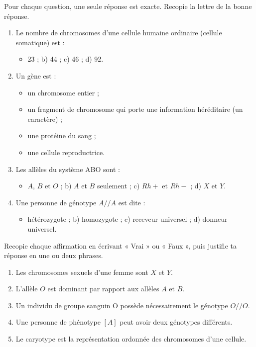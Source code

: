 \documentclass[11pt]{article}
\begin{document}
\begin{exercice}
Pour chaque question, une seule réponse est exacte. Recopie la lettre de la bonne réponse.
\begin{enumerate}
\item Le nombre de chromosomes d'une cellule humaine ordinaire (cellule somatique) est :
\begin{itemize}
\item[a)] 23 ; \quad b) 44 ; \quad c) 46 ; \quad d) 92.
\end{itemize}
\item Un gène est :
\begin{itemize}
\item[a)] un chromosome entier ;
\item[b)] un fragment de chromosome qui porte une information héréditaire (un caractère) ;
\item[c)] une protéine du sang ;
\item[d)] une cellule reproductrice.
\end{itemize}
\item Les allèles du système ABO sont :
\begin{itemize}
\item[a)] $A$, $B$ et $O$ ; \quad b) $A$ et $B$ seulement ; \quad c) $Rh+$ et $Rh-$ ; \quad d) $X$ et $Y$.
\end{itemize}
\item Une personne de génotype $A//A$ est dite :
\begin{itemize}
\item[a)] hétérozygote ; \quad b) homozygote ; \quad c) receveur universel ; \quad d) donneur universel.
\end{itemize}
\end{enumerate}
\end{exercice}

\begin{exercice}
Recopie chaque affirmation en écrivant « Vrai » ou « Faux », puis justifie ta réponse en une ou deux phrases.
\begin{enumerate}
\item Les chromosomes sexuels d'une femme sont $X$ et $Y$.
\item L'allèle $O$ est dominant par rapport aux allèles $A$ et $B$.
\item Un individu de groupe sanguin O possède nécessairement le génotype $O//O$.
\item Une personne de phénotype $[A]$ peut avoir deux génotypes différents.
\item Le caryotype est la représentation ordonnée des chromosomes d'une cellule.
\end{enumerate}
\end{exercice}
\end{document}
